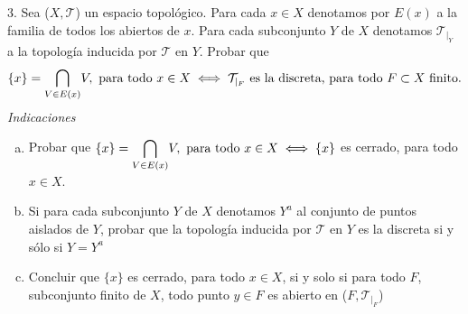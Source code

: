 \documentclass[12pt,twoside]{report}
\newcommand\mc[1]{\mathcal{#1}}
\theoremstyle{azul}
\theoremstyle{azul2}
\theoremstyle{plain}
\theoremstyle{definition}
\theoremstyle{remark}
\begin{document}
3. Sea ($X, \mc{T}$) un espacio topológico. Para cada $x \in X$ denotamos por $E(x)$ a la familia de todos los abiertos de $x$. Para cada subconjunto $Y$ de $X$ denotamos $\mc{T}_{|_Y}$ a la topología inducida por $\mc{T}$ en $Y$. Probar que $$\{x\} = \underset{V \in E(x)}{\mathlarger{\bigcap}} V, \text{ para todo } x \in X \; \Longleftrightarrow \; \mc{T}_{|_F} \text{ es la discreta, para todo } F \subset X \text{ finito.}$$
\textit{Indicaciones}
\vspace{-3mm}
\begin{enumerate}[(a)]
    \item Probar que $\{x\} = \underset{V \in E(x)}{\mathlarger{\bigcap}} V, \text{ para todo } x \in X \; \Longleftrightarrow \; \{x\} $ es cerrado, para todo $x \in X$.
    \item Si para cada subconjunto $Y$ de $X$ denotamos $Y^a$ al conjunto de puntos aislados de $Y$, probar que la topología inducida por $\mc{T}$ en $Y$ es la discreta si y sólo si $Y=Y^a$
    \item Concluir que $\{x\} $ es cerrado, para todo $x \in X$, si y solo si para todo $F$, subconjunto finito de $X$, todo punto $y \in F$ es abierto en ($F,  \mc{T}_{|_F}$)
\end{enumerate}
\end{document}

